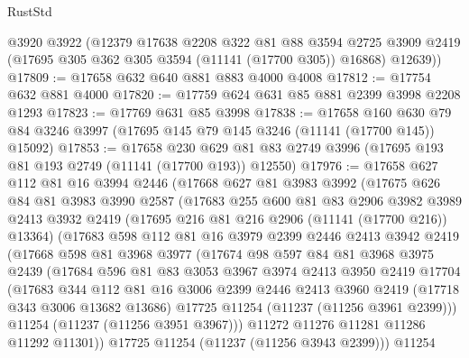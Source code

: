 \begin{lexlean}{RustStd}
\begin{coremodule}
      @3920
      @3922
      (@12379
        @17638
        @2208
        @322
        @81
        @88
        @3594
        @2725
        @3909
        @2419
        (@17695 @305 @362 @305 @3594 (@11141 (@17700 @305)) @16868)
        @12639))
@17809 := @17658 @632 @640 @881 @883 @4000 @4008
@17812 := @17754 @632 @881 @4000
@17820 := @17759 @624 @631 @85 @881 @2399 @3998 @2208 @1293
@17823 := @17769 @631 @85 @3998
@17838 := @17658
    @160
    @630
    @79
    @84
    @3246
    @3997
    (@17695 @145 @79 @145 @3246 (@11141 (@17700 @145)) @15092)
@17853 := @17658
    @230
    @629
    @81
    @83
    @2749
    @3996
    (@17695 @193 @81 @193 @2749 (@11141 (@17700 @193)) @12550)
@17976 := @17658
    @627
    @112
    @81
    @16
    @3994
    @2446
    (@17668
      @627
      @81
      @3983
      @3992
      (@17675
        @626
        @84
        @81
        @3983
        @3990
        @2587
        (@17683
          @255
          @600
          @81
          @83
          @2906
          @3982
          @3989
          @2413
          @3932
          @2419
          (@17695 @216 @81 @216 @2906 (@11141 (@17700 @216)) @13364)
          (@17683
            @598
            @112
            @81
            @16
            @3979
            @2399
            @2446
            @2413
            @3942
            @2419
            (@17668
              @598
              @81
              @3968
              @3977
              (@17674
                @98
                @597
                @84
                @81
                @3968
                @3975
                @2439
                (@17684
                  @596
                  @81
                  @83
                  @3053
                  @3967
                  @3974
                  @2413
                  @3950
                  @2419
                  @17704
                  (@17683
                    @344
                    @112
                    @81
                    @16
                    @3006
                    @2399
                    @2446
                    @2413
                    @3960
                    @2419
                    (@17718 @343 @3006 @13682 @13686)
                    @17725
                    @11254
                    (@11237 (@11256 @3961 @2399)))
                  @11254
                  (@11237 (@11256 @3951 @3967)))
                @11272
                @11276
                @11281
                @11286
                @11292
                @11301))
            @17725
            @11254
            (@11237 (@11256 @3943 @2399)))
          @11254

\end{coremodule}
\end{lexlean}
